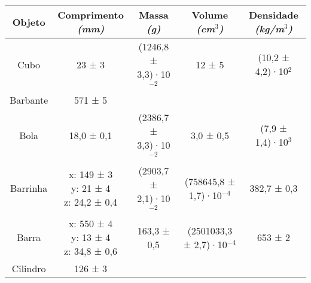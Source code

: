 \documentclass{article}
\begin{document}
\begin{table}[h!]
\centering
\begin{tabular}{c c c c c }
\toprule
Objeto & \shortstack{Comprimento\\\textit{(mm)}} & \shortstack{Massa\\\textit{(g)}} & \shortstack{Volume\\\textit{(cm$^3$)}} & \shortstack{Densidade\\\textit{(kg/m$^3$)}} \\
\midrule
Cubo & 23 ± 3 & (1246,8 ± 3,3)·10$^{-2}$ & 12 ± 5 & (10,2 ± 4,2)·10$^{2}$\\[5pt]
Barbante & 571 ± 5 & & & \\[5pt]
Bola & 18,0 ± 0,1 & (2386,7 ± 3,3)·10$^{-2}$ & 3,0 ± 0,5 & (7,9 ± 1,4)·10$^{3}$\\[5pt]
Barrinha & \shortstack{x: 149 ± 3\\y: 21 ± 4\\z: 24,2 ± 0,4} & (2903,7 ± 2,1)·10$^{-2}$ & (758645,8 ± 1,7)·10$^{-4}$ & 382,7 ± 0,3\\[5pt]
Barra & \shortstack{x: 550 ± 4\\y: 13 ± 4\\z: 34,8 ± 0,6} & 163,3 ± 0,5 & (2501033,3 ± 2,7)·10$^{-4}$ & 653 ± 2\\[5pt]
Cilindro & 126 ± 3 & & & \\[5pt]
\bottomrule
\end{tabular}
\end{table}
\end{document}
